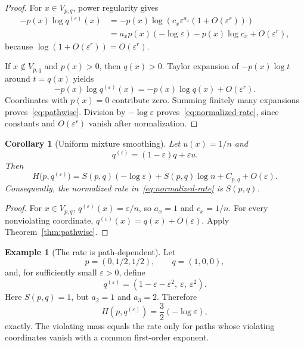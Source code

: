 \documentclass[11pt,a4paper]{article}
\newtheorem{corollary}[theorem]{Corollary}
\theoremstyle{definition}
\newtheorem{example}[theorem]{Example}
\theoremstyle{remark}
\begin{document}
\begin{proof}
For $x\in V_{p,q}$, power regularity gives
\begin{align*}
  -p(x)\log q^{(\varepsilon)}(x)
  &= -p(x)\log\!\left(
      c_x\varepsilon^{a_x}(1+O(\varepsilon^r))
     \right) \\
  &= a_xp(x)(-\log\varepsilon)
     -p(x)\log c_x
     +O(\varepsilon^r),
\end{align*}
because $\log(1+O(\varepsilon^r))=O(\varepsilon^r)$.

If $x\notin V_{p,q}$ and $p(x)>0$, then $q(x)>0$.
Taylor expansion of $-p(x)\log t$ around $t=q(x)$ yields
\[
  -p(x)\log q^{(\varepsilon)}(x)
  = -p(x)\log q(x)+O(\varepsilon^r).
\]
Coordinates with $p(x)=0$ contribute zero.
Summing finitely many expansions proves~\eqref{eq:pathwise}.
Division by $-\log\varepsilon$ proves~\eqref{eq:normalized-rate}, since constants and $O(\varepsilon^r)$ vanish after normalization.
\end{proof}

\begin{corollary}[Uniform mixture smoothing]
\label{cor:uniform}
Let $u(x)=1/n$ and
\[
  q^{(\varepsilon)}=(1-\varepsilon)q+\varepsilon u.
\]
Then
\begin{equation}
  H\bigl(p,q^{(\varepsilon)}\bigr)
  = S(p,q)(-\log\varepsilon)
    +S(p,q)\log n
    +C_{p,q}
    +O(\varepsilon).
  \label{eq:uniform}
\end{equation}
Consequently, the normalized rate in~\eqref{eq:normalized-rate} is $S(p,q)$.
\end{corollary}

\begin{proof}
For $x\in V_{p,q}$, $q^{(\varepsilon)}(x)=\varepsilon/n$, so $a_x=1$ and $c_x=1/n$.
For every nonviolating coordinate, $q^{(\varepsilon)}(x)=q(x)+O(\varepsilon)$.
Apply Theorem~\ref{thm:pathwise}.
\end{proof}

\begin{example}[The rate is path-dependent]
\label{ex:anisotropic}
Let
\[
  p=(0,1/2,1/2),
  \qquad
  q=(1,0,0),
\]
and, for sufficiently small $\varepsilon>0$, define
\[
  q^{(\varepsilon)}=(1-\varepsilon-\varepsilon^2,\ \varepsilon,\ \varepsilon^2).
\]
Here $S(p,q)=1$, but $a_2=1$ and $a_3=2$.
Therefore
\[
  H(p,q^{(\varepsilon)})
  = \frac32(-\log\varepsilon),
\]
exactly.
The violating mass equals the rate only for paths whose violating coordinates vanish with a common first-order exponent.
\end{example}
\end{document}
